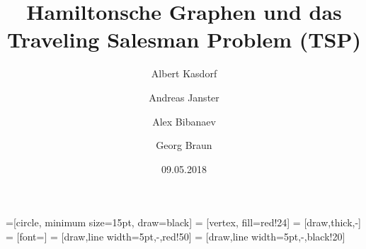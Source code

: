 \documentclass{article}
\title{Hamiltonsche Graphen und das\\ Traveling Salesman Problem (TSP)}
\author{
  Albert Kasdorf\and
  Andreas Janster\and
  Alex Bibanaev\and
  Georg Braun}
\date{09.05.2018}
\newtheorem{mydef}{Definition}
\begin{document}
=[circle, minimum size=15pt, draw=black]
 = [vertex, fill=red!24]
 = [draw,thick,-]
 = [font=\small]
 = [draw,line width=5pt,-,red!50]
 = [draw,line width=5pt,-,black!20]

\maketitle


%
%
%
%
%
%
%
%
%
%
%
%
%
\end{document}

